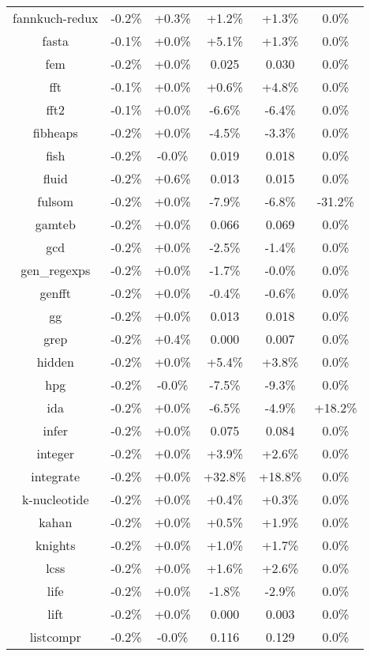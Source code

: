 \begin{tabular}{ c c c c c c }
fannkuch-redux & -0.2\% & +0.3\% & +1.2\% & +1.3\% &  0.0\%\\
fasta & -0.1\% & +0.0\% & +5.1\% & +1.3\% &  0.0\%\\
fem & -0.2\% & +0.0\% & 0.025 & 0.030 &  0.0\%\\
fft & -0.1\% & +0.0\% & +0.6\% & +4.8\% &  0.0\%\\
fft2 & -0.1\% & +0.0\% & -6.6\% & -6.4\% &  0.0\%\\
fibheaps & -0.2\% & +0.0\% & -4.5\% & -3.3\% &  0.0\%\\
fish & -0.2\% & -0.0\% & 0.019 & 0.018 &  0.0\%\\
fluid & -0.2\% & +0.6\% & 0.013 & 0.015 &  0.0\%\\
fulsom & -0.2\% & +0.0\% & -7.9\% & -6.8\% & -31.2\%\\
gamteb & -0.2\% & +0.0\% & 0.066 & 0.069 &  0.0\%\\
gcd & -0.2\% & +0.0\% & -2.5\% & -1.4\% &  0.0\%\\
gen\_regexps & -0.2\% & +0.0\% & -1.7\% & -0.0\% &  0.0\%\\
genfft & -0.2\% & +0.0\% & -0.4\% & -0.6\% &  0.0\%\\
gg & -0.2\% & +0.0\% & 0.013 & 0.018 &  0.0\%\\
grep & -0.2\% & +0.4\% & 0.000 & 0.007 &  0.0\%\\
hidden & -0.2\% & +0.0\% & +5.4\% & +3.8\% &  0.0\%\\
hpg & -0.2\% & -0.0\% & -7.5\% & -9.3\% &  0.0\%\\
ida & -0.2\% & +0.0\% & -6.5\% & -4.9\% & +18.2\%\\
infer & -0.2\% & +0.0\% & 0.075 & 0.084 &  0.0\%\\
integer & -0.2\% & +0.0\% & +3.9\% & +2.6\% &  0.0\%\\
integrate & -0.2\% & +0.0\% & +32.8\% & +18.8\% &  0.0\%\\
k-nucleotide & -0.2\% & +0.0\% & +0.4\% & +0.3\% &  0.0\%\\
kahan & -0.2\% & +0.0\% & +0.5\% & +1.9\% &  0.0\%\\
knights & -0.2\% & +0.0\% & +1.0\% & +1.7\% &  0.0\%\\
lcss & -0.2\% & +0.0\% & +1.6\% & +2.6\% &  0.0\%\\
life & -0.2\% & +0.0\% & -1.8\% & -2.9\% &  0.0\%\\
lift & -0.2\% & +0.0\% & 0.000 & 0.003 &  0.0\%\\
listcompr & -0.2\% & -0.0\% & 0.116 & 0.129 &  0.0\%\\

\end{tabular}
